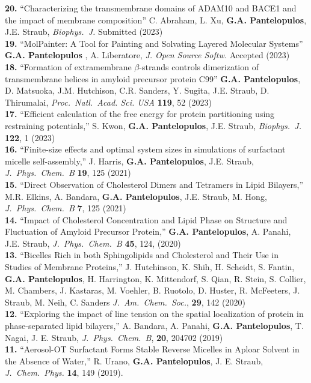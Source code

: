 \documentclass[a4paper]{article}
\def\jpcb{\it J.~Phys.~Chem.~B}
\def\jcp{\it J.~Chem.~Phys.}
\def\pnas{\it Proc.~Natl.~Acad. Sci. USA}
\def\jacs{\it J.~Am.~Chem.~Soc.}
\def\bj{\it Biophys.~J.}
\def\jpcb{\it J.~Phys.~Chem.~B}
\begin{document}
\small
{\bf 20.} ``Characterizing the transmembrane domains of ADAM10 and BACE1 and the impact of membrane composition'' C. Abraham, L. Xu, {\bf G.A. Pantelopulos}, J.E. Straub, {\bj} Submitted (2023)\\
{\bf 19.} ``MolPainter: A Tool for Painting and Solvating Layered Molecular Systems'' {\bf G.A. Pantelopulos} , A. Liberatore, {\it J. Open Source Softw.} Accepted (2023)\\ 
{\bf 18.} ``Formation of extramembrane $\beta$-strands controls dimerization of transmembrane helices in amyloid precursor protein C99'' {\bf G.A. Pantelopulos}, D. Matsuoka, J.M. Hutchison, C.R. Sanders, Y. Sugita, J.E. Straub, D. Thirumalai, {\pnas} {\bf 119}, 52 (2023)\\
{\bf 17.}  ``Efficient calculation of the free energy for protein partitioning using restraining potentials,'' S. Kwon, {\bf G.A. Pantelopulos}, J.E. Straub, {\bj} {\bf 122}, 1 (2023)\\
{\bf 16.} ``Finite-size effects and optimal system sizes in simulations of surfactant micelle self-assembly,'' J. Harris, {\bf G.A. Pantelopulos}, J.E. Straub, {\jpcb} {\bf 19}, 125 (2021)\\
{\bf 15.} ``Direct Observation of Cholesterol Dimers and Tetramers in Lipid Bilayers,''  M.R. Elkins, A. Bandara, {\bf G.A. Pantelopulos}, J.E. Straub, M. Hong, {\jpcb} {\bf 7}, 125 (2021)\\
{\bf 14.} ``Impact of Cholesterol Concentration and Lipid Phase on Structure and Fluctuation of Amyloid Precursor Protein,'' \textbf{G.A. Pantelopulos}, A. Panahi, J.E. Straub, {\jpcb} {\bf 45}, 124, (2020)\\
{\bf 13.} ``Bicelles Rich in both Sphingolipids and Cholesterol and Their Use in Studies of Membrane Proteins,''  J. Hutchinson, K. Shih, H. Scheidt, S. Fantin,  \textbf{G.A. Pantelopulos}, H. Harrington, K. Mittendorf, S. Qian, R. Stein, S. Collier, M. Chambers, J. Kastaras, M. Voehler, B. Ruotolo, D. Huster, R. McFeeters, J. Straub, M. Neih, C. Sanders {\jacs}, {\bf 29}, 142 (2020)\\
{\bf 12.} ``Exploring the impact of line tension on the spatial localization of protein in phase-separated lipid bilayers,''  A. Bandara, A. Panahi, \textbf{G.A. Pantelopulos}, T. Nagai, J. E. Straub, {\jpcb}, {\bf 20}, 204702 (2019)\\
{\bf 11.} ``Aerosol-OT Surfactant Forms Stable Reverse Micelles in Aploar Solvent in the Absence of Water,'' R. Urano, \textbf{G.A. Pantelopulos}, J. E. Straub, {\jcp} {\bf 14}, 149 (2019). \\
\end{document}
